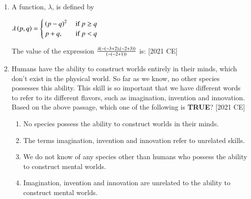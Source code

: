 \documentclass[journal]{IEEEtran}
\begin{document}
\begin{enumerate}
\hfill [2021 CE]
\begin{enumerate}
\end{enumerate}
\item A function, $\lambda$, is defined by
\begin{center}
    $\lambda\left(p,q\right) =
    \begin{cases}
        \left(p-q\right)^2 & \text{ if } p \geq q \\
        p + q, & \text{ if } p < q
    \end{cases}$
\end{center}
The value of the expression $\frac{\lambda\left(-\left(-3+2\right), \left(-2 + 3\right)\right)}{\left(-\left(-2 +1\right)\right)}$ is: \hfill [2021 CE]
\begin{enumerate}
\end{enumerate}
\item Humans have the ability to construct worlds entirely in their minds, which
don't exist in the physical world. So far as we know, no other species
possesses this ability. This skill is so important that we have different words
to refer to its different flavors, such as imagination, invention and
innovation.\\
Based on the above passage, which one of the following is \textbf{TRUE}? \hfill [2021 CE]
\begin{enumerate}
    \item No species possess the ability to construct worlds in their minds.
    \item The terms imagination, invention and innovation refer to unrelated skills.
    \item We do not know of any species other than humans who possess the ability to
construct mental worlds.
\item Imagination, invention and innovation are unrelated to the ability to construct
mental worlds.

\end{enumerate}
\end{enumerate}
\end{document}
